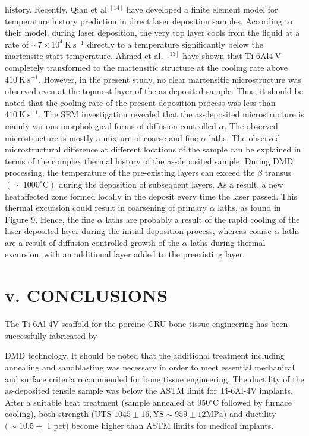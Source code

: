 \documentclass[10pt]{article}
\begin{document}
history. Recently, Qian et al ${ }^{[14]}$ have developed a finite element model for temperature history prediction in direct laser deposition samples. According to their model, during laser deposition, the very top layer cools from the liquid at a rate of $\sim 7 \times 10^{4} \mathrm{~K} \mathrm{~s}^{-1}$ directly to a temperature significantly below the martensite start temperature. Ahmed et al. ${ }^{[13]}$ have shown that Ti-6Al$4 \mathrm{~V}$ completely transformed to the martensitic structure at the cooling rate above $410 \mathrm{~K} \mathrm{~s}^{-1}$. However, in the present study, no clear martensitic microstructure was observed even at the topmost layer of the as-deposited sample. Thus, it should be noted that the cooling rate of the present deposition process was less than $410 \mathrm{~K} \mathrm{~s}^{-1}$. The SEM investigation revealed that the as-deposited microstructure is mainly various morphological forms of diffusion-controlled $\alpha$. The observed microstructure is mostly a mixture of coarse and fine $\alpha$ laths. The observed microstructural difference at different locations of the sample can be explained in terms of the complex thermal history of the as-deposited sample. During DMD processing, the temperature of the pre-existing layers can exceed the $\beta$ transus $\left(\sim 1000^{\circ} \mathrm{C}\right)$ during the deposition of subsequent layers. As a result, a new heataffected zone formed locally in the deposit every time the laser passed. This thermal excursion could result in coarsening of primary $\alpha$ laths, as found in Figure 9. Hence, the fine $\alpha$ laths are probably a result of the rapid cooling of the laser-deposited layer during the initial deposition process, whereas coarse $\alpha$ laths are a result of diffusion-controlled growth of the $\alpha$ laths during thermal excursion, with an additional layer added to the preexisting layer.

\section*{v. CONCLUSIONS}
The Ti-6Al-4V scaffold for the porcine CRU bone tissue engineering has been successfully fabricated by

DMD technology. It should be noted that the additional treatment including annealing and sandblasting was necessary in order to meet essential mechanical and surface criteria recommended for bone tissue engineering. The ductility of the as-deposited tensile sample was below the ASTM limit for Ti-6Al-4V implants. After a suitable heat treatment (sample annealed at $950{ }^{\circ} \mathrm{C}$ followed by furnace cooling), both strength (UTS $1045 \pm 16, \mathrm{YS} \sim 959 \pm 12 \mathrm{MPa})$ and ductility $(\sim 10.5 \pm$ 1 pct) become higher than ASTM limits for medical implants.
\end{document}

